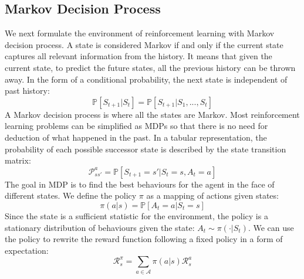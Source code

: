 \documentclass[oneside,11pt,a4paper]{article}
\begin{document}
\subsection{Markov Decision Process}
We next formulate the environment of reinforcement learning with Markov decision process. A state is considered Markov if and only if the current state captures all relevant information from the history. It means that given the current state, to predict the future states, all the previous history can be thrown away. In the form of a conditional probability, the next state is independent of past history:
$$
\mathbb P[S_{t+1}|S_t]=\mathbb P[S_{t+1}|S_1,...,S_t]
$$
A Markov decision process is where all the states are Markov. Most reinforcement learning problems can be simplified as MDPs so that there is no need for deduction of what happened in the past. In a tabular representation, the probability of each possible successor state is described by the state transition matrix:
$$
\mathcal P_{ss'}^a=\mathbb P[S_{t+1}=s'|S_t=s, A_t=a]
$$
The goal in MDP is to find the best behaviours for the agent in the face of different states. We define the policy $\pi$ as a mapping of actions given states:
$$
\pi(a|s) = \mathbb P[A_t=a|S_t=s]
$$
Since the state is a sufficient statistic for the environment, the policy is a stationary distribution of behaviours given the state: $A_t \sim \pi(\cdot|S_t)$. We can use the policy to rewrite the reward function following a fixed policy in a form of expectation:
$$
\mathcal R_s^\pi = \sum_{a\in \mathcal A}\pi(a|s)\mathcal R_s^a
$$
\end{document}
